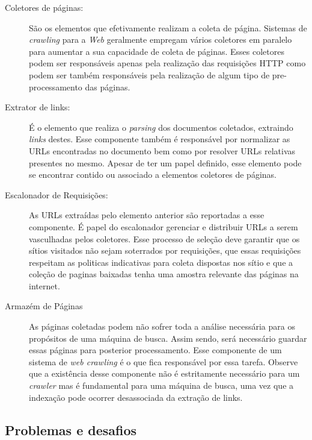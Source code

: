 \documentclass[10pt,twocolumn]{article}
\begin{document}
\begin{description}

\item[Coletores de páginas:] São os elementos que efetivamente realizam
a coleta de página. Sistemas de \emph{crawling} para a \emph{Web}
geralmente empregam vários coletores em paralelo para aumentar a sua
capacidade de coleta de páginas. Esses coletores podem ser responsáveis
apenas pela realização das requisições HTTP como podem ser também
responsáveis pela realização de algum tipo de pre-processamento das
páginas.

\item[Extrator de links:] É o elemento que realiza o \emph{parsing} dos
documentos coletados, extraindo \emph{links} destes. Esse componente
também é responsável por normalizar as URLs encontradas no documento bem
como por resolver URLs relativas presentes no mesmo. Apesar de ter um
papel definido, esse elemento pode se encontrar contido ou associado a
elementos coletores de páginas.

\item[Escalonador de Requisições:] As URLs extraídas pelo elemento
anterior são reportadas a esse componente. É papel do
escalonador gerenciar e distribuir URLs a serem vasculhadas pelos
coletores. Esse processo de seleção deve garantir que os sítios
visitados não sejam soterrados por requisições, que essas requisições
respeitam as politicas indicativas para coleta dispostas nos sítio e que
a coleção de paginas baixadas tenha uma amostra relevante das páginas na
internet.

\item[Armazém de Páginas] As páginas coletadas podem não sofrer toda a
análise necessária para os propósitos de uma máquina de busca. Assim
sendo, será necessário guardar essas páginas para posterior
processamento. Esse componente de um sistema de \emph{web crawling} é o
que fica responsável por essa tarefa. Observe que a existência desse
componente não é estritamente necessário para um \emph{crawler} mas é
fundamental para uma máquina de busca, uma vez que a indexação pode
ocorrer desassociada da extração de links.

\end{description}

\subsection{Problemas e desafios}
\end{document}
